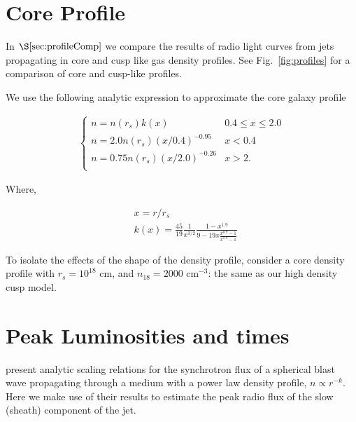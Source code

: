 \documentclass[usenatbib,fleqn]{mnras}
\begin{document}
\appendix
\section{Core Profile}
\label{app:core}
In $\S\ref{sec:profileComp}$ we compare the results of radio
light curves from jets propagating in core and cusp like gas density
profiles. See Fig.~\ref{fig:profiles} for a comparison of core and
cusp-like profiles. 

We use the following analytic expression to approximate the core
galaxy profile

\begin{align}
\begin{cases}
n=n(r_s) k(x) & 0.4 \leq x\leq 2.0\\
n = 2.0 n(r_s) (x/0.4)^{-0.95} & x < 0.4\\
n = 0.75 n(r_s) (x/2.0)^{-0.26} & x>2.\\
\end{cases}
\label{eq:cores}
\end{align}

Where, 

\begin{align}
  &x=r/r_s\\\nonumber
  &k(x)=\frac{45}{19} \frac{1}{x^{3/2}} \frac{1-x^{1.9}}{9-19
      x\frac{x^{0.9}-1}{x^{1.9}-1}}
\end{align}

To isolate the effects of the shape of the density profile, consider a
core density profile with $r_s=10^{18}$ cm, and $n_{18}=2000$
cm$^{-3}$: the same as our high density cusp model.

\section{Peak Luminosities and times}
\label{app:analyt}
\citet{Leventis+2012} present analytic scaling relations for the
synchrotron flux of a spherical blast wave propagating through a
medium with a power law density profile, $n\propto r^{-k}$.  Here we
make use of their results to estimate the peak radio flux of the slow
(sheath) component of the jet.
\end{document}
